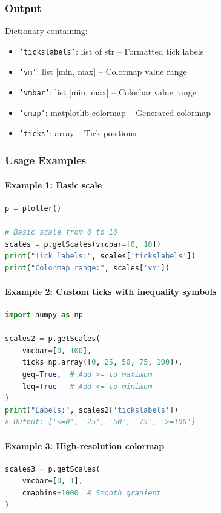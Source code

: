 \documentclass[11pt,a4paper]{article}
\begin{document}
\subsubsection{Output}
Dictionary containing:
\begin{itemize}[leftmargin=*]
    \item \texttt{'tickslabels'}: list of str -- Formatted tick labels
    \item \texttt{'vm'}: list [min, max] -- Colormap value range
    \item \texttt{'vmbar'}: list [min, max] -- Colorbar value range
    \item \texttt{'cmap'}: matplotlib colormap -- Generated colormap
    \item \texttt{'ticks'}: array -- Tick positions
\end{itemize}

\subsubsection{Usage Examples}

\paragraph{Example 1: Basic scale}
\begin{lstlisting}[language=Python, caption=Basic color scale]
p = plotter()

# Basic scale from 0 to 10
scales = p.getScales(vmcbar=[0, 10])
print("Tick labels:", scales['tickslabels'])
print("Colormap range:", scales['vm'])
\end{lstlisting}

\paragraph{Example 2: Custom ticks with inequality symbols}
\begin{lstlisting}[language=Python, caption=Custom ticks with inequality symbols]
import numpy as np

scales2 = p.getScales(
    vmcbar=[0, 100],
    ticks=np.array([0, 25, 50, 75, 100]),
    geq=True,  # Add >= to maximum
    leq=True   # Add <= to minimum
)
print("Labels:", scales2['tickslabels'])
# Output: ['<=0', '25', '50', '75', '>=100']
\end{lstlisting}

\paragraph{Example 3: High-resolution colormap}
\begin{lstlisting}[language=Python, caption=High-resolution smooth colormap]
scales3 = p.getScales(
    vmcbar=[0, 1],
    cmapbins=1000  # Smooth gradient
)
\end{lstlisting}
\end{document}
